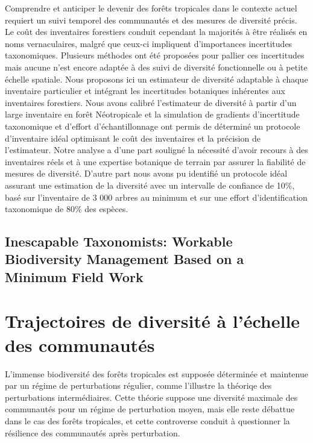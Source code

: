 \documentclass[
  11pt,
  french,
  A4paper,
  extrafontsizes,onecolumn,openright
  ]{memoir}
\begin{document}
Comprendre et anticiper le devenir des forêts tropicales dans le
contexte actuel requiert un suivi temporel des communautés et des
mesures de diversité précis. Le coût des inventaires forestiers conduit
cependant la majorités à être réalisés en noms vernaculaires, malgré que
ceux-ci impliquent d'importances incertitudes taxonomiques. Plusieurs
méthodes ont été proposées pour pallier ces incertitudes mais aucune
n'est encore adaptée à des suivi de diversité fonctionnelle ou à petite
échelle spatiale. Nous proposons ici un estimateur de diversité
adaptable à chaque inventaire particulier et intégrant les incertitudes
botaniques inhérentes aux inventaires forestiers. Nous avons calibré
l'estimateur de diversité à partir d'un large inventaire en forêt
Néotropicale et la simulation de gradients d'incertitude taxonomique et
d'effort d'échantillonnage ont permis de déterminé un protocole
d'inventaire idéal optimisant le coût des inventaires et la précision de
l'estimateur. Notre analyse a d'une part souligné la nécessité d'avoir
recours à des inventaires réels et à une expertise botanique de terrain
par assurer la fiabilité de mesures de diversité. D'autre part nous
avons pu identifié un protocole idéal assurant une estimation de la
diversité avec un intervalle de confiance de 10\%, basé sur l'inventaire
de 3 000 arbres au minimum et sur une effort d'identification
taxonomique de 80\% des espèces.

\newpage

\section*{Inescapable Taxonomists: Workable Biodiversity Management
Based on a Minimum Field
Work}\label{inescapable-taxonomists-workable-biodiversity-management-based-on-a-minimum-field-work}

\chapter{Trajectoires de diversité à l'échelle des
communautés}\label{trajectoires-de-diversite-a-lechelle-des-communautes}

L'immense biodiversité des forêts tropicales est supposée déterminée et
maintenue par un régime de perturbations régulier, comme l'illustre la
théoriqe des perturbations intermédiaires. Cette théorie suppose une
diversité maximale des communautés pour un régime de perturbation moyen,
mais elle reste débattue dans le cas des forêts tropicales, et cette
controverse conduit à questionner la résilience des communautés après
perturbation.
\end{document}
